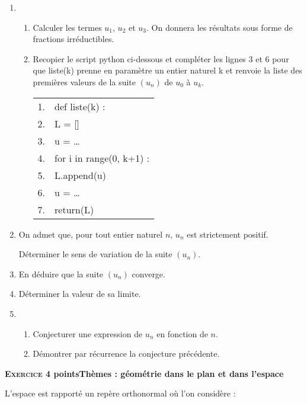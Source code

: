 \documentclass[10pt,a4paper]{article}
\begin{document}
\begin{enumerate}
\item 
	\begin{enumerate}
		\item Calculer les termes $u_1$, $u_2$  et $u_3$. On  donnera les résultats sous forme de fractions irréductibles.
		\item Recopier le script python ci-dessous et compléter les lignes 3 et 6 pour que liste(k) prenne en paramètre un entier naturel k et renvoie la liste des premières valeurs de la suite $\left(u_n\right)$ de $u_0$ à $u_k$.

\begin{center}
\begin{tabularx}{0.5\linewidth}{|l|X|}\hline
1.&def liste(k) :\\
2.&\qquad L = []\\
3.&\qquad u = \ldots\\
4.&\qquad for i in range(0, k+1) :\\
5.&\quad \qquad L.append(u)\\
6.&\quad \qquad u = \ldots\\
7.&\qquad return(L)\\ \hline
\end{tabularx}
\end{center}
	\end{enumerate}
\item On admet que, pour tout entier naturel $n$, $u_n$ est strictement positif.

Déterminer le sens de variation de la suite $\left(u_n\right)$.
\item En déduire que la suite $\left(u_n\right)$ converge.
\item Déterminer la valeur de sa limite.
\item 
	\begin{enumerate}
		\item Conjecturer une expression de $u_n$ en fonction de $n$.
		\item Démontrer par récurrence la conjecture précédente.
	\end{enumerate}
\end{enumerate}

\bigskip

\textbf{\textsc{Exercice 4}   points\hfill Thèmes : géométrie dans le plan et dans l'espace}

\medskip

L'espace est rapporté un repère orthonormal où l'on considère :
\end{document}
